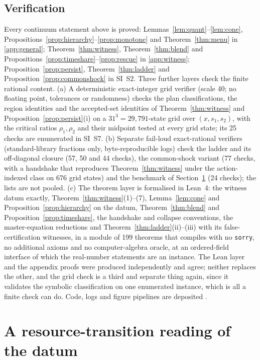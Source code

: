\documentclass[preprint,11pt,authoryear]{elsarticle}
\theoremstyle{definition}
\theoremstyle{remark}
\begin{document}
\subsection{Verification}\label{sec:verification}

Every continuum statement above is proved: Lemmas~\ref{lem:quant}--\ref{lem:cone}, Propositions~\ref{prop:hierarchy}--\ref{prop:monotone} and Theorem~\ref{thm:menu} in \ref{app:general}; Theorem~\ref{thm:witness}, Theorem~\ref{thm:blend} and Propositions~\ref{prop:timeshare}--\ref{prop:rescue} in \ref{app:witness}; Proposition~\ref{prop:persist}, Theorem~\ref{thm:ladder} and Proposition~\ref{prop:commonshock} in SI~S2. Three further layers check the finite rational content. (a) A deterministic exact-integer grid verifier (scale 40; no floating point, tolerances or randomness) checks the plan classifications, the region identities and the accepted-set identities of Theorem~\ref{thm:witness} and Proposition~\ref{prop:persist}(i) on a $31^3=29{,}791$-state grid over $(x,s_1,s_2)$, with the critical ratios $\rho_1,\rho_2$ and their midpoint tested at every grid state; its 25 checks are enumerated in SI~S7. (b) Separate fail-loud exact-rational verifiers (standard-library fractions only, byte-reproducible logs) check the ladder and its off-diagonal closure (57, 50 and 44 checks), the common-shock variant (77 checks, with a handshake that reproduces Theorem~\ref{thm:witness} under the action-indexed class on 676 grid states) and the benchmark of Section~\ref{sec:benchmark} (24 checks); the lists are not pooled. (c) The theorem layer is formalised in Lean~4: the witness datum exactly, Theorem~\ref{thm:witness}(1)--(7), Lemma~\ref{lem:cone} and Proposition~\ref{prop:hierarchy} on the datum, Theorem~\ref{thm:blend} and Proposition~\ref{prop:timeshare}, the handshake and collapse conventions, the master-equation reductions and Theorem~\ref{thm:ladder}(ii)--(iii) with its false-certification witnesses, in a module of 199 theorems that compiles with no \texttt{sorry}, no additional axioms and no computer-algebra oracle, at an ordered-field interface of which the real-number statements are an instance. The Lean layer and the appendix proofs were produced independently and agree; neither replaces the other, and the grid check is a third and separate thing again, since it validates the symbolic classification on one enumerated instance, which is all a finite check can do. Code, logs and figure pipelines are deposited \citep{Abaee2026code}.

\section{A resource-transition reading of the datum}\label{sec:benchmark}
\end{document}
